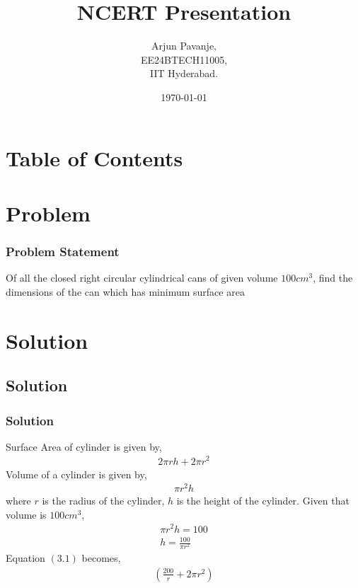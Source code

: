 \documentclass{beamer}
\title{NCERT Presentation}
\author{Arjun Pavanje,\\ EE24BTECH11005,\\IIT Hyderabad.\\}
\date{\today}
\providecommand{\brak}[1]{\ensuremath{\left(#1\right)}}
\theoremstyle{remark}
\numberwithin{equation}{section}
\begin{document}
		\begin{frame}
			\titlepage
		\end{frame}

		\section*{Table of Contents}
		\begin{frame}
			\tableofcontents
		\end{frame}
		\section{Problem}
		\begin{frame}
			\frametitle{Problem Statement}
Of all the closed right circular cylindrical cans of given volume  $100 cm^3$, find the dimensions of the can which has minimum surface area \newline
    \end{frame}
		\section{Solution}
    \subsection{Solution}
    \begin{frame}
      \frametitle{Solution}
Surface Area of cylinder is given by, 
\begin{align}
  2\pi rh + 2\pi r^2
\end{align}
Volume of a cylinder is given by, 
\begin{align}
  \pi r^2 h
\end{align}
where $r$ is the radius of the cylinder, $h$ is the height of the cylinder.\newline
Given that volume is $100 cm^3$,
\begin{align}
  \pi r^2 h = 100\\
  h = \frac{100}{\pi r^2}
\end{align}
Equation $\brak{3.1}$ becomes,
\begin{align}
  \brak{\frac{200}{r} + 2\pi r^2}
\end{align}      

    \end{frame}
\end{document}
